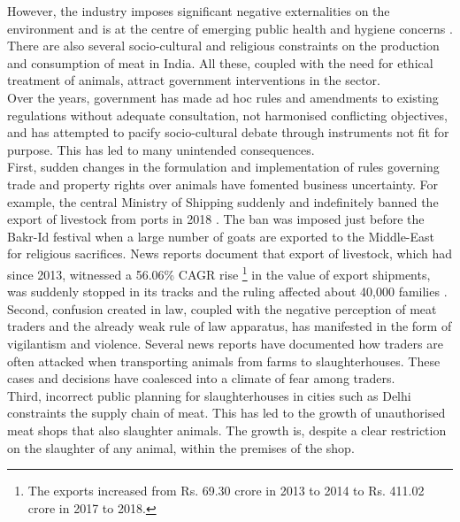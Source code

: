 \documentclass[a4paper, 12pt]{article}
\begin{document}
However, the industry imposes significant negative externalities on the environment and is at the centre of emerging public health and hygiene concerns \parencite{praderepaper}. There are also several socio-cultural and religious constraints on the production and consumption of meat in India. All these, coupled with the need for ethical treatment of animals, attract government interventions in the sector. \\

Over the years, government has made ad hoc rules and amendments to existing regulations without adequate consultation, not harmonised conflicting objectives, and has attempted to pacify socio-cultural debate through instruments not fit for purpose. This has led to many unintended consequences.\\

First, sudden changes in the formulation and implementation of rules governing trade and property rights over animals have fomented business uncertainty. For example, the central Ministry of Shipping suddenly and indefinitely banned the export of livestock from ports in 2018 \parencite{kateshiyanews}. The ban was imposed just before the Bakr-Id festival when a large number of goats are exported to the Middle-East for religious sacrifices. News reports document that export of livestock, which had since 2013, witnessed a 56.06\% CAGR rise \footnote { The exports increased from Rs. 69.30 crore in 2013 to 2014 to Rs. 411.02 crore in 2017 to 2018.} in the value of export shipments, was suddenly stopped in its tracks and the ruling affected about 40,000 families \parencite{hindunews}. \\

Second, confusion created in law, coupled with the negative perception of meat traders and the already weak rule of law apparatus, has manifested in the form of vigilantism and violence. Several news reports have documented how traders are often attacked when transporting animals from farms to slaughterhouses. These cases and decisions have coalesced into a climate of fear among traders.\\

Third, incorrect public planning for slaughterhouses in cities such as Delhi constraints the supply chain of meat. This has led to the growth of unauthorised meat shops that also slaughter animals. The growth is, despite a clear restriction on the slaughter of any animal, within the premises of the shop. \\
\end{document}
